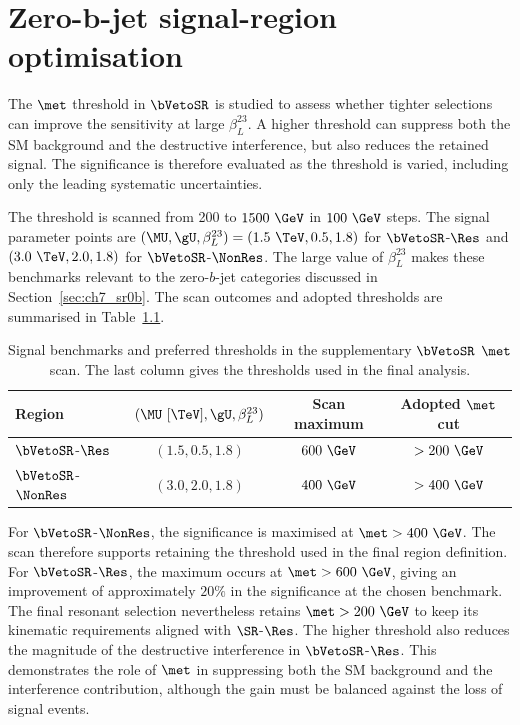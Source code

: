 \chapter{Zero-b-jet signal-region optimisation}
\label{app:sr0b_optimisation}

The $\met$ threshold in $\bVetoSR$ is studied to assess whether tighter selections can improve the sensitivity at large $\beta_L^{23}$.
A higher threshold can suppress both the SM background and the destructive interference, but also reduces the retained signal.
The significance is therefore evaluated as the threshold is varied, including only the leading systematic uncertainties.

The threshold is scanned from 200 to $1500~\GeV$ in $100~\GeV$ steps.
The signal parameter points are $(\MU,\gU,\beta_L^{23})=(1.5~\TeV,0.5,1.8)$ for $\bVetoSR$-$\Res$ and $(3.0~\TeV,2.0,1.8)$ for $\bVetoSR$-$\NonRes$.
The large value of $\beta_L^{23}$ makes these benchmarks relevant to the zero-$b$-jet categories discussed in Section~\ref{sec:ch7_sr0b}.
The scan outcomes and adopted thresholds are summarised in Table~\ref{tab:app_sr0b_scan}.

\begin{table}[htbp]
    \centering
    \small
    \caption{Signal benchmarks and preferred thresholds in the supplementary $\bVetoSR$ $\met$ scan. The last column gives the thresholds used in the final analysis.}
    \label{tab:app_sr0b_scan}
    \begin{tabular}{lccc}
        \toprule
        Region & $(\MU~[\TeV],\gU,\beta_L^{23})$ & Scan maximum & Adopted $\met$ cut \\
        \midrule
        $\bVetoSR$-$\Res$ & $(1.5,0.5,1.8)$ & $600~\GeV$ & $>200~\GeV$ \\
        $\bVetoSR$-$\NonRes$ & $(3.0,2.0,1.8)$ & $400~\GeV$ & $>400~\GeV$ \\
        \bottomrule
    \end{tabular}
\end{table}

For $\bVetoSR$-$\NonRes$, the significance is maximised at $\met>400~\GeV$.
The scan therefore supports retaining the threshold used in the final region definition.
For $\bVetoSR$-$\Res$, the maximum occurs at $\met>600~\GeV$, giving an improvement of approximately $20\%$ in the significance at the chosen benchmark.
The final resonant selection nevertheless retains $\met>200~\GeV$ to keep its kinematic requirements aligned with $\SR$-$\Res$.
The higher threshold also reduces the magnitude of the destructive interference in $\bVetoSR$-$\Res$.
This demonstrates the role of $\met$ in suppressing both the SM background and the interference contribution, although the gain must be balanced against the loss of signal events.
